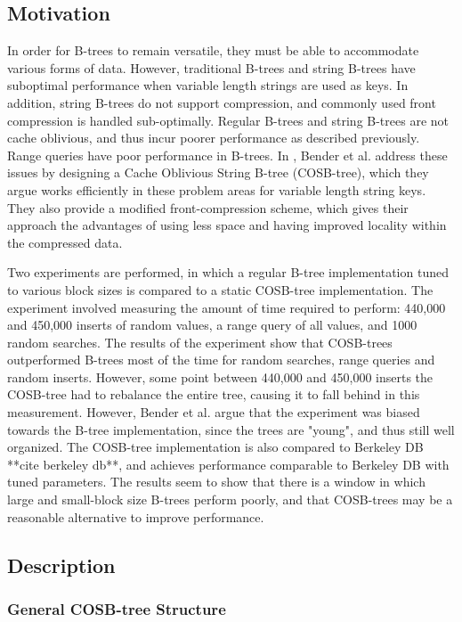 \documentclass{style}
\begin{document}
\subsection{Motivation}

In order for B-trees to remain versatile, they must be able to accommodate
various forms of data. However, traditional B-trees and string B-trees have
suboptimal performance when variable length strings are used as keys. In
addition, string B-trees do not support compression, and commonly used front
compression is handled sub-optimally. Regular B-trees and string B-trees are
not cache oblivious, and thus incur poorer performance as described
previously. Range queries have poor performance in B-trees. In
\cite{BenderFaKu06}, Bender et al. address these issues by designing a Cache
Oblivious String B-tree (COSB-tree), which they argue works efficiently in
these problem areas for variable length string keys. They also provide a
modified front-compression scheme, which gives their approach the advantages
of using less space and having improved locality within the compressed data.

Two experiments are performed, in which a regular B-tree implementation tuned
to various block sizes is compared to a static COSB-tree implementation. The
experiment involved measuring the amount of time required to perform: 440,000
and 450,000 inserts of random values, a range query of all values, and 1000
random searches. The results of the experiment show that COSB-trees
outperformed B-trees most of the time for random searches, range queries and
random inserts. However, some point between 440,000 and 450,000 inserts the
COSB-tree had to rebalance the entire tree, causing it to fall behind in this
measurement. However, Bender et al. argue that the experiment was biased
towards the B-tree implementation, since the trees are "young", and thus still
well organized. The COSB-tree implementation is also compared to Berkeley DB
**cite berkeley db**, and achieves performance comparable to Berkeley DB with
tuned parameters. The results seem to show that there is a window in which
large and small-block size B-trees perform poorly, and that COSB-trees may be
a reasonable alternative to improve performance. 

\subsection{Description}

\subsubsection{General COSB-tree Structure}
\end{document}
